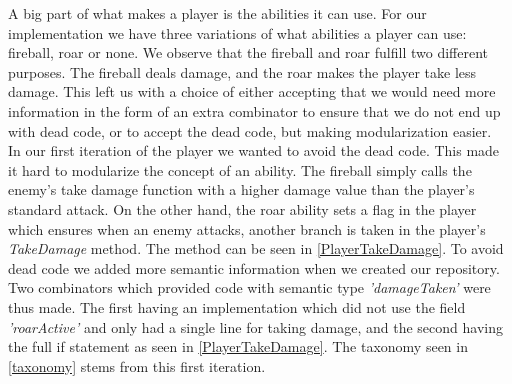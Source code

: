 A big part of what makes a player is the abilities it can use. For our implementation we have three variations of what abilities a player can use: fireball, roar or none. We observe that the fireball and roar fulfill two different purposes. The fireball deals damage, and the roar makes the player take less damage. This left us with a choice of either accepting that we would need more information in the form of an extra combinator to ensure that we do not end up with dead code, or to accept the dead code, but making modularization  easier.\\
In our first iteration of the player we wanted to avoid the dead code. This made it hard to modularize the concept of an ability. The fireball simply calls the enemy's take damage function with a higher damage value than the player's standard attack. On the other hand, the roar ability sets a flag in the player which ensures when an enemy attacks, another branch is taken in the player's \textit{TakeDamage} method. The method can be seen in \autoref{PlayerTakeDamage}. To avoid dead code we added more semantic information when we created our repository. Two combinators which provided code with semantic type \textit{'damageTaken'} were thus made. The first having an implementation which did not use the field \textit{'roarActive'} and only had a single line for taking damage, and the second having the full if statement as seen in \autoref{PlayerTakeDamage}. The taxonomy seen in \autoref{taxonomy} stems from this first iteration.


